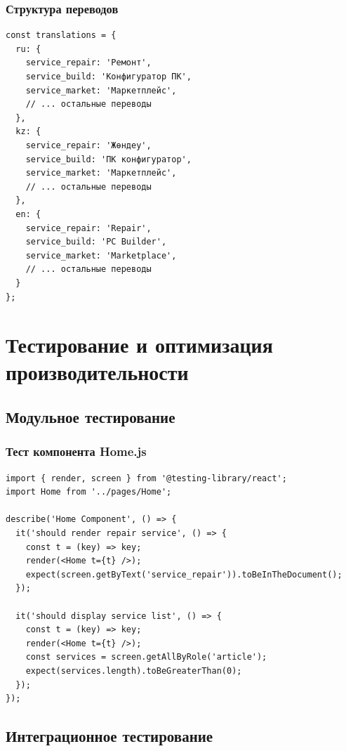 \documentclass[12pt,a4paper]{report}
\begin{document}
\subsection{Структура переводов}
\begin{lstlisting}
const translations = {
  ru: {
    service_repair: 'Ремонт',
    service_build: 'Конфигуратор ПК',
    service_market: 'Маркетплейс',
    // ... остальные переводы
  },
  kz: {
    service_repair: 'Жөндеу',
    service_build: 'ПК конфигуратор',
    service_market: 'Маркетплейс',
    // ... остальные переводы
  },
  en: {
    service_repair: 'Repair',
    service_build: 'PC Builder',
    service_market: 'Marketplace',
    // ... остальные переводы
  }
};
\end{lstlisting}

\newpage

\chapter{Тестирование и оптимизация производительности}

\section{Модульное тестирование}

\subsection{Тест компонента Home.js}
\begin{lstlisting}
import { render, screen } from '@testing-library/react';
import Home from '../pages/Home';

describe('Home Component', () => {
  it('should render repair service', () => {
    const t = (key) => key;
    render(<Home t={t} />);
    expect(screen.getByText('service_repair')).toBeInTheDocument();
  });

  it('should display service list', () => {
    const t = (key) => key;
    render(<Home t={t} />);
    const services = screen.getAllByRole('article');
    expect(services.length).toBeGreaterThan(0);
  });
});
\end{lstlisting}

\section{Интеграционное тестирование}
\end{document}
